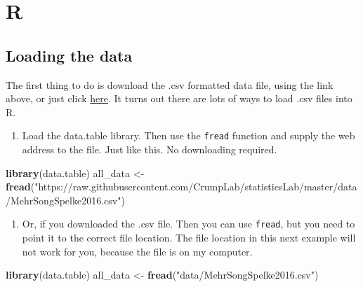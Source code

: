 \documentclass[
]{book}
\newenvironment{Shaded}{\begin{snugshade}}{\end{snugshade}}
\newcommand{\FunctionTok}[1]{\textcolor[rgb]{0.13,0.29,0.53}{\textbf{#1}}}
\newcommand{\NormalTok}[1]{#1}
\newcommand{\OtherTok}[1]{\textcolor[rgb]{0.56,0.35,0.01}{#1}}
\newcommand{\StringTok}[1]{\textcolor[rgb]{0.31,0.60,0.02}{#1}}
\providecommand{\tightlist}{%
  \setlength{\itemsep}{0pt}\setlength{\parskip}{0pt}}
\begin{document}
\hypertarget{r-4}{%
\section{R}\label{r-4}}

\hypertarget{loading-the-data}{%
\subsection{Loading the data}\label{loading-the-data}}

The first thing to do is download the .csv formatted data file, using the link above, or just click \href{https://drive.google.com/open?id=0Bz-rhZ21ShvOdW1wV0pmUTJSSk0}{here}. It turns out there are lots of ways to load .csv files into R.

\begin{enumerate}
\def\labelenumi{\arabic{enumi}.}
\tightlist
\item
  Load the data.table library. Then use the \texttt{fread} function and supply the web address to the file. Just like this. No downloading required.
\end{enumerate}

\begin{Shaded}
\begin{Highlighting}[]
\FunctionTok{library}\NormalTok{(data.table)}
\NormalTok{all\_data }\OtherTok{\textless{}{-}} \FunctionTok{fread}\NormalTok{(}\StringTok{"https://raw.githubusercontent.com/CrumpLab/statisticsLab/master/data/MehrSongSpelke2016.csv"}\NormalTok{)}
\end{Highlighting}
\end{Shaded}

\begin{enumerate}
\def\labelenumi{\arabic{enumi}.}
\setcounter{enumi}{1}
\tightlist
\item
  Or, if you downloaded the .csv file. Then you can use \texttt{fread}, but you need to point it to the correct file location. The file location in this next example will not work for you, because the file is on my computer.
\end{enumerate}

\begin{Shaded}
\begin{Highlighting}[]
\FunctionTok{library}\NormalTok{(data.table)}
\NormalTok{all\_data }\OtherTok{\textless{}{-}} \FunctionTok{fread}\NormalTok{(}\StringTok{"data/MehrSongSpelke2016.csv"}\NormalTok{)}
\end{Highlighting}
\end{Shaded}
\end{document}
